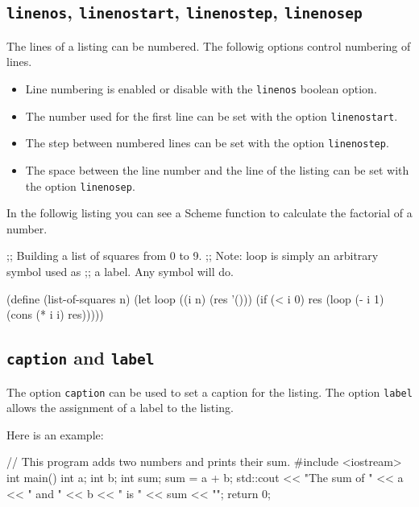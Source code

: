 \documentclass[10pt,a4paper]{article}
\begin{document}
\subsection{\texttt{linenos}, \texttt{linenostart}, \texttt{linenostep}, \texttt{linenosep}}

The lines of a listing can be numbered. The followig options control
numbering of lines.
\begin{itemize}
  \item Line numbering is enabled or disable with the \verb|linenos|
  boolean option.
  \item The number used for the first line can be set with the option
  \verb|linenostart|.
  \item The step between numbered lines can be set with the option
  \verb|linenostep|.
  \item The space between the line number and the line of the listing
  can be set with the option \verb|linenosep|.
\end{itemize}

In the followig listing you can see a Scheme function to calculate the
factorial of a number.

\begin{Example}
\begin{pygmented}[lang=scheme,linenos,linenostart=1001,linenostep=2,linenosep=5mm]
;; Building a list of squares from 0 to 9.
;; Note: loop is simply an arbitrary symbol used as
;; a label. Any symbol will do.

(define (list-of-squares n)
  (let loop ((i n) (res '()))
    (if (< i 0)
        res
        (loop (- i 1) (cons (* i i) res)))))
\end{pygmented}
\end{Example}

\subsection{\texttt{caption} and \texttt{label}}

The option \verb|caption| can be used to set a caption for the listing.
The option \verb|label| allows the assignment of a label to the listing.

Here is an example:

\begin{Example}
\begin{pygmented}[lang=c++,label=lst:test,caption=A \textbf{C++} example]
// This program adds two numbers and prints their sum.
#include <iostream>
int main()
{
  int a;
  int b;
  int sum;
  sum = a + b;
  std::cout << "The sum of " << a << " and " << b
            << " is " << sum << "\n";
  return 0;
}
\end{pygmented}
\end{Example}
\end{document}

